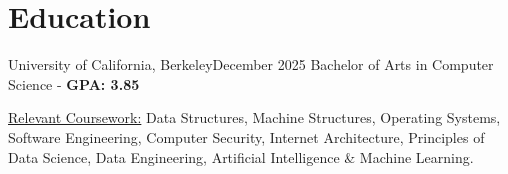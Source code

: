 \section{Education}
    \resumeSubHeadingListStart
    \resumeSubheading
    {University of California, Berkeley}{December 2025}
    {Bachelor of Arts in Computer Science - \textbf{GPA: 3.85}}{}
    \begin{itemize}[leftmargin=0.12in,label={}]
    \small{\item{
        \underline{Relevant Coursework:}{ 
            Data Structures,
            Machine Structures,
            Operating Systems,
            Software Engineering,
            Computer Security,
            Internet Architecture,
            Principles of Data Science,
            Data Engineering,
            Artificial Intelligence \& Machine Learning.
        }
    }}
    \end{itemize}
    \vspace{-5pt}  %
    \resumeSubHeadingListEnd